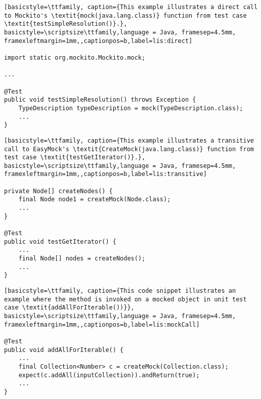 \begin{lstlisting}[basicstyle=\ttfamily, caption={This example illustrates a direct call to Mockito's \textit{mock(java.lang.class)} function from test case \textit{testSimpleResolution()}.},
basicstyle=\scriptsize\ttfamily,language = Java, framesep=4.5mm,
framexleftmargin=1mm,,captionpos=b,label=lis:direct]

import static org.mockito.Mockito.mock;

...

@Test
public void testSimpleResolution() throws Exception {
	TypeDescription typeDescription = mock(TypeDescription.class);
	...
}

\end{lstlisting}

\begin{lstlisting}[basicstyle=\ttfamily, caption={This example illustrates a transitive call to EasyMock's \textit{CreateMock(java.lang.class)} function from test case \textit{testGetIterator()}.},
basicstyle=\scriptsize\ttfamily,language = Java, framesep=4.5mm,
framexleftmargin=1mm,,captionpos=b,label=lis:transitive]

private Node[] createNodes() {
	final Node node1 = createMock(Node.class);
	...
}

@Test
public void testGetIterator() {
	...
	final Node[] nodes = createNodes();
	...
}

\end{lstlisting}

\begin{lstlisting}[basicstyle=\ttfamily, caption={This code snippet illustrates an example where the method is invoked on a mocked object in unit test case \textit{addAllForIterable())}},
basicstyle=\scriptsize\ttfamily,language = Java, framesep=4.5mm,
framexleftmargin=1mm,,captionpos=b,label=lis:mockCall]

@Test
public void addAllForIterable() {
	...
	final Collection<Number> c = createMock(Collection.class);
	expect(c.addAll(inputCollection)).andReturn(true);
	...
}

\end{lstlisting}